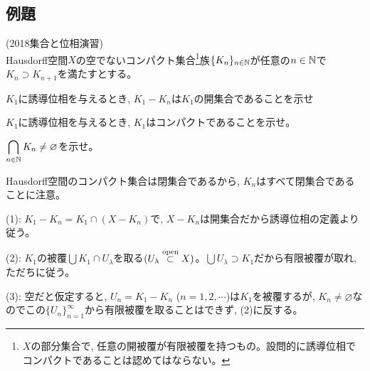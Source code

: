 \subsection{例題}
\begin{egprob} (2018集合と位相演習)\\
Hausdorff空間$X$の空でないコンパクト集合\footnote{$X$の部分集合で, 任意の開被覆が有限被覆を持つもの。設問的に誘導位相でコンパクトであることは認めてはならない。}族$\{ K_n \}_{n\in \mathbb{N}}$が任意の$n\in \mathbb{N}$で$K_n\supset K_{n+1}$を満たすとする。
\ben
\item $K_1$に誘導位相を与えるとき, $K_1-K_n$は$K_1$の開集合であることを示せ
\item $K_1$に誘導位相を与えるとき, $K_1$はコンパクトであることを示せ。
\item $\displaystyle\bigcap_{n\in \mathbb{N}}K_n \neq \varnothing$を示せ。
\een
\end{egprob}
\begin{egans}
Hausdorff空間のコンパクト集合は閉集合であるから, $K_n$はすべて閉集合であることに注意。

(1): $K_1 - K_n = K_1 \cap (X-K_n)$で, $X-K_n$は開集合だから誘導位相の定義より従う。

(2): $K_1$の被覆$\bigcup K_1\cap U_{\lambda}$を取る$(U_{\lambda} \overset{\mathrm{open}}{\subset} X)$。$\bigcup U_{\lambda} \supset K_1$だから有限被覆が取れ, ただちに従う。

(3): 空だと仮定すると, $U_n = K_1 - K_n$ ($n=1,2,\cdots$)は$K_1$を被覆するが, $K_n\neq \varnothing$なのでこの$\{ U_n \}_{n=1}^{\infty}$から有限被覆を取ることはできず, (2)に反する。
\end{egans}





